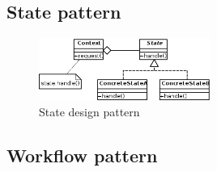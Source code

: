 \subsection{State pattern}
\begin{figure}[h]
\caption{State design pattern}
\centering
\includegraphics[width=0.5\textwidth]{images/stateDesignPattern.png}
\end{figure}

\subsection{Workflow pattern}

